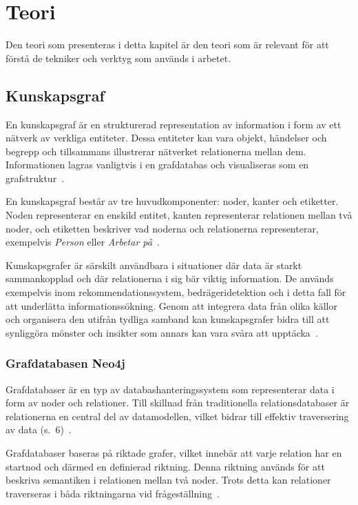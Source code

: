 \section{Teori}\label{sec:theory} 
Den teori som presenteras i detta kapitel är den teori som är relevant för att förstå de tekniker och verktyg som används i arbetet.


\subsection{Kunskapsgraf}\label{subsec:Kunskapsgraf}

En kunskapsgraf är en strukturerad representation av information i form av ett nätverk av verkliga entiteter.
Dessa entiteter kan vara objekt, händelser och begrepp och tillsammans illustrerar nätverket relationerna mellan dem.
Informationen lagras vanligtvis i en grafdatabas och visualiseras som en grafstruktur~\cite{21}.

En kunskapsgraf består av tre huvudkomponenter: noder, kanter och etiketter.
Noden representerar en enskild entitet,
kanten representerar relationen mellan två noder, och etiketten beskriver vad noderna och relationerna representerar, exempelvis \textit{Person} eller \textit{Arbetar på}~\cite{21}.

Kunskapsgrafer är särskilt användbara i situationer där data är starkt sammankopplad och där relationerna i sig bär viktig information.
 De används exempelvis inom rekommendationssystem, bedrägeridetektion och i detta fall för att underlätta informationssökning.
Genom att integrera data från olika källor och organisera den utifrån tydliga samband kan kunskapsgrafer bidra till att synliggöra mönster och insikter som annars kan vara svåra att upptäcka~\cite{5}.


\subsubsection{Grafdatabasen Neo4j}

Grafdatabaser är en typ av databashanteringssystem som representerar data i form av noder och relationer.
Till skillnad från traditionella relationsdatabaser är relationerna en central del av datamodellen, vilket bidrar till effektiv traversering av data (s.~6)~\cite{robinson2015graph}.

Grafdatabaser baseras på riktade grafer, vilket innebär att varje relation har en startnod och därmed en definierad riktning.
Denna riktning används för att beskriva semantiken i relationen mellan två noder.
Trots detta kan relationer traverseras i båda riktningarna vid frågeställning~\cite{10}.

